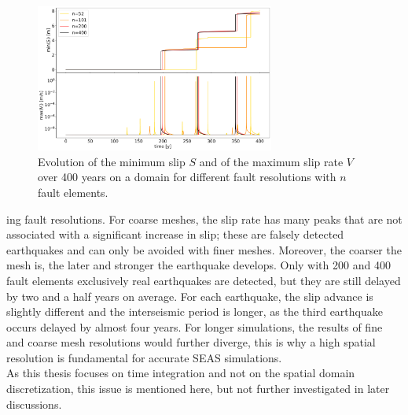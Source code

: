 \begin{figure}[H]
	\centering
	\includegraphics[width=0.7\textwidth]{images/TANDEMtimeEvolution_2D_scalability_extendedODE_RK.png}
	\caption{Evolution of the minimum slip $S$ and of the maximum slip rate $V$ over 400 years on a domain for different fault resolutions with $n$ fault elements.}
	\label{fig:EvolutionAllQuantitiesScalability}
\end{figure}

 \noindent ing fault resolutions. For coarse meshes, the slip rate has many peaks that are not associated with a significant increase in slip; these are falsely detected earthquakes and can only be avoided with finer meshes. Moreover, the coarser the mesh is, the later and stronger the earthquake develops. Only with 200 and 400 fault elements exclusively real earthquakes are detected, but they are still delayed by two and a half years on average. For each earthquake, the slip advance is slightly different and the interseismic period is longer, as the third earthquake occurs delayed by almost four years. For longer simulations, the results of fine and coarse mesh resolutions would further diverge, this is why a high spatial resolution is fundamental for accurate SEAS simulations. \\


As this thesis focuses on time integration and not on the spatial domain discretization, this issue is mentioned here, but not further investigated in later discussions.
